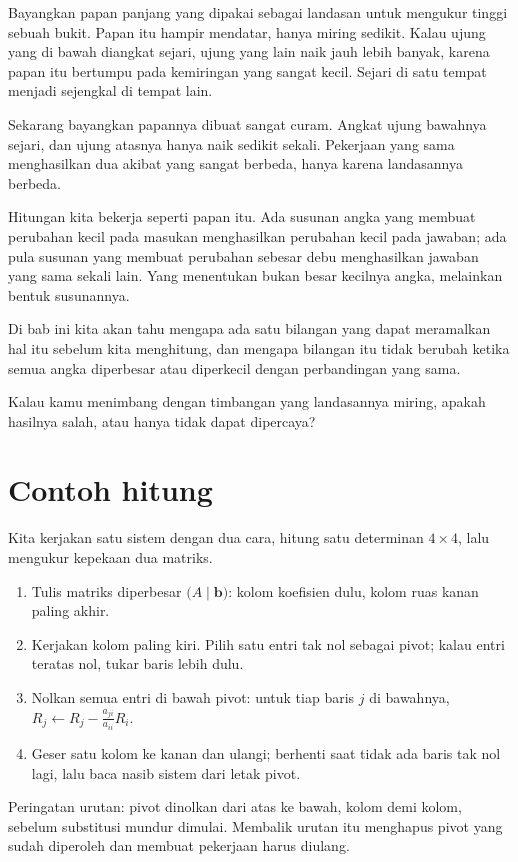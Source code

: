 \begin{untukanak}
Bayangkan papan panjang yang dipakai sebagai landasan untuk mengukur tinggi sebuah bukit.
Papan itu hampir mendatar, hanya miring sedikit. Kalau ujung yang di bawah diangkat sejari,
ujung yang lain naik jauh lebih banyak, karena papan itu bertumpu pada kemiringan yang
sangat kecil. Sejari di satu tempat menjadi sejengkal di tempat lain.

Sekarang bayangkan papannya dibuat sangat curam. Angkat ujung bawahnya sejari, dan ujung
atasnya hanya naik sedikit sekali. Pekerjaan yang sama menghasilkan dua akibat yang sangat
berbeda, hanya karena landasannya berbeda.

Hitungan kita bekerja seperti papan itu. Ada susunan angka yang membuat perubahan kecil pada
masukan menghasilkan perubahan kecil pada jawaban; ada pula susunan yang membuat perubahan
sebesar debu menghasilkan jawaban yang sama sekali lain. Yang menentukan bukan besar kecilnya
angka, melainkan bentuk susunannya.

Di bab ini kita akan tahu mengapa ada satu bilangan yang dapat meramalkan hal itu sebelum
kita menghitung, dan mengapa bilangan itu tidak berubah ketika semua angka diperbesar atau
diperkecil dengan perbandingan yang sama.

Kalau kamu menimbang dengan timbangan yang landasannya miring, apakah hasilnya salah, atau
hanya tidak dapat dipercaya?
\end{untukanak}

\section{Contoh hitung}

Kita kerjakan satu sistem dengan dua cara, hitung satu determinan $4\times4$, lalu mengukur
kepekaan dua matriks.

\begin{resep}
\begin{enumerate}
  \item Tulis matriks diperbesar $\bigl(A\mid\mathbf{b}\bigr)$: kolom koefisien dulu, kolom
        ruas kanan paling akhir.
  \item Kerjakan kolom paling kiri. Pilih satu entri tak nol sebagai pivot; kalau entri
        teratas nol, tukar baris lebih dulu.
  \item Nolkan semua entri di bawah pivot: untuk tiap baris $j$ di bawahnya,
        $R_{j}\leftarrow R_{j}-\frac{a_{ji}}{a_{ii}}R_{i}$.
  \item Geser satu kolom ke kanan dan ulangi; berhenti saat tidak ada baris tak nol lagi,
        lalu baca nasib sistem dari letak pivot.
\end{enumerate}
Peringatan urutan: pivot dinolkan dari atas ke bawah, kolom demi kolom, sebelum substitusi
mundur dimulai. Membalik urutan itu menghapus pivot yang sudah diperoleh dan membuat
pekerjaan harus diulang.
\end{resep}

